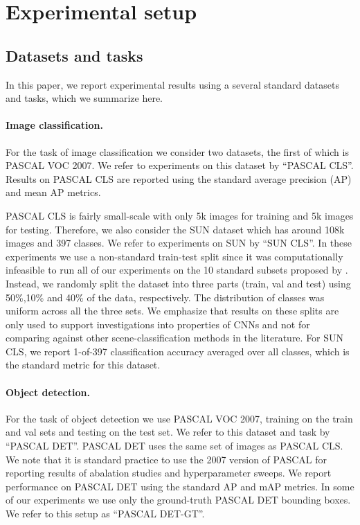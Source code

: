 \section{Experimental setup}
\label{sec:train}

\subsection{Datasets and tasks}
In this paper, we report experimental results using a several standard datasets and tasks, which we summarize here.

\paragraph{Image classification.} For the task of image classification we consider two datasets, the first of which is PASCAL VOC 2007.
We refer to experiments on this dataset by ``PASCAL CLS''.
Results on PASCAL CLS are reported using the standard average precision (AP) and mean AP metrics.

PASCAL CLS is fairly small-scale with only 5k images for training and 5k images for testing.
Therefore, we also consider the SUN dataset \cite{sun} which has around 108k images and 397 classes.
We refer to experiments on SUN by ``SUN CLS''.
In these experiments we use a non-standard train-test split since it was computationally infeasible to run all of our experiments on the 10 standard subsets proposed by \cite{sun}. 
Instead, we randomly split the dataset into three parts (train, val and test) using 50\%,10\% and 40\% of the data, respectively. 
The distribution of classes was uniform across all the three sets.
We emphasize that results on these splits are only used to support investigations into properties of CNNs and not for comparing against other scene-classification methods in the literature.
For SUN CLS, we report 1-of-397 classification accuracy averaged over all classes, which is the standard metric for this dataset.

\paragraph{Object detection.} For the task of object detection we use PASCAL VOC 2007, training on the train and val sets and testing on the test set.
We refer to this dataset and task by ``PASCAL DET''.
PASCAL DET uses the same set of images as PASCAL CLS.
We note that it is standard practice to use the 2007 version of PASCAL for reporting results of abalation studies and hyperparameter sweeps.
We report performance on PASCAL DET using the standard AP and mAP metrics.
In some of our experiments we use only the ground-truth PASCAL DET bounding boxes.
We refer to this setup as ``PASCAL DET-GT''.

